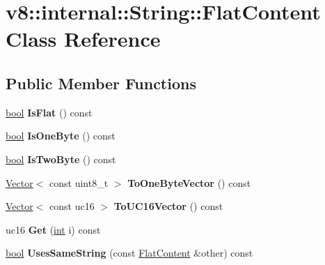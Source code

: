 \hypertarget{classv8_1_1internal_1_1String_1_1FlatContent}{}\section{v8\+:\+:internal\+:\+:String\+:\+:Flat\+Content Class Reference}
\label{classv8_1_1internal_1_1String_1_1FlatContent}
\subsection*{Public Member Functions}
\begin{DoxyCompactItemize}
\item 
\mbox{\label{classv8_1_1internal_1_1String_1_1FlatContent_a483b0df0bd1ac65774f670845019d75f}} 
\mbox{\hyperlink{classbool}{bool}} {\bfseries Is\+Flat} () const
\item 
\mbox{\label{classv8_1_1internal_1_1String_1_1FlatContent_a3b4907c3447e7f474b0825b8db8138f0}} 
\mbox{\hyperlink{classbool}{bool}} {\bfseries Is\+One\+Byte} () const
\item 
\mbox{\label{classv8_1_1internal_1_1String_1_1FlatContent_a00d04cc56a894ba79373a521904b6a77}} 
\mbox{\hyperlink{classbool}{bool}} {\bfseries Is\+Two\+Byte} () const
\item 
\mbox{\label{classv8_1_1internal_1_1String_1_1FlatContent_aed2a685ddb22993e37eccd2258167ba4}} 
\mbox{\hyperlink{classv8_1_1internal_1_1Vector}{Vector}}$<$ const uint8\+\_\+t $>$ {\bfseries To\+One\+Byte\+Vector} () const
\item 
\mbox{\label{classv8_1_1internal_1_1String_1_1FlatContent_af7e8c953eebdcc46623b2bd759841136}} 
\mbox{\hyperlink{classv8_1_1internal_1_1Vector}{Vector}}$<$ const uc16 $>$ {\bfseries To\+U\+C16\+Vector} () const
\item 
\mbox{\label{classv8_1_1internal_1_1String_1_1FlatContent_ad9d867dff0eaa9b38297ceedd08391d1}} 
uc16 {\bfseries Get} (\mbox{\hyperlink{classint}{int}} i) const
\item 
\mbox{\label{classv8_1_1internal_1_1String_1_1FlatContent_a7852c591ca32e3051c7af153ca421d43}} 
\mbox{\hyperlink{classbool}{bool}} {\bfseries Uses\+Same\+String} (const \mbox{\hyperlink{classv8_1_1internal_1_1String_1_1FlatContent}{Flat\+Content}} \&other) const
\end{DoxyCompactItemize}

